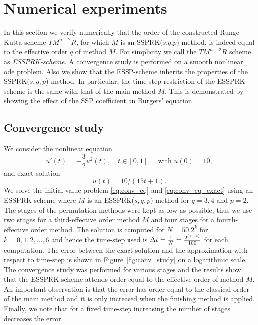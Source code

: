 \section{Numerical experiments}\label{sec:numerics}

In this section we verify numerically that the order of the constructed 
Runge-Kutta scheme $TM^{n-2}R$, for which $M$ is an SSPRK($s$,$q$,$p$) 
method, is indeed equal to the effective order $q$ of method $M$. 
For simplicity we call the $TM^{n-2}R$ scheme as \emph{ESSPRK-scheme}. 
A convergence study is performed on a smooth nonlinear ode problem. 
Also we show that the ESSP-scheme inherits the properties of the 
SSPRK($s,q,p$) method. 
In particular, the time-step restriction of the ESSPRK-scheme is the same 
with that of the main method $M$. 
This is demonstrated by showing the effect of the SSP coefficient on 
Burgers' equation.

\subsection{Convergence study}\label{subsec:convergence}
We consider the nonlinear equation
\begin{equation}\label{eq:conv_eq}
    u'(t) = -\frac{3}{2}u^{2}(t), \quad t \in [0,1], \quad \text{with } u(0) = 10,
\end{equation}
and exact solution
\begin{equation}\label{eq:conv_eq_exact}
    u(t) = 10/(15t + 1).
\end{equation}
We solve the initial value problem \eqref{eq:conv_eq} and 
\eqref{eq:conv_eq_exact} using an ESSPRK-scheme where $M$ is an 
ESSPRK($s,q,p$) method for $q = 3, 4$ and $p = 2$.
The stages of the permutation methods were kept as low as possible, thus 
we use two stages for a third-effective order method $M$ and four stages for 
a fourth-effective order method. 
The solution is computed for $N = 50.2^{k}$ for $k = 0, 1, 2, \dots, 6$ and 
hence the time-step used is $\Delta t = \tfrac{1}{N} = \tfrac{2^{(1-k)}}{100}$ 
for each computation. 
The error between the exact solution and the approximation with respect 
to time-step is shown in Figure~\ref{fig:conv_study} on a logarithmic scale.
The convergence study was performed for various stages and the results 
show that the ESSPRK-scheme attends order equal to the effective order of 
method $M$. 
An important observation is that the error has order equal to the classical 
order of the main method and it is only increased when the finishing method 
is applied.
Finally, we note that for a fixed time-step increasing the number of stages
decreases the error.

